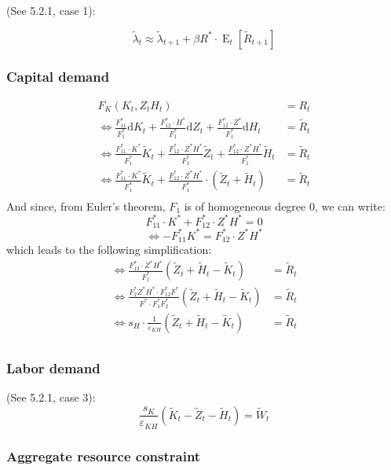\documentclass[12pt]{report}
\def\D{\mathrm{d}}
\newcommand{\Et}[1]{\operatorname{E}_t\left[#1\right]}
\def\D{\mathrm{d}}
\begin{document}
(See 5.2.1, case 1):

$$\tilde\lambda_t  \approx \tilde\lambda_{t+1} + \beta R^*\cdot\Et{\tilde R_{t+1}}$$

\subsubsection{Capital demand}

\begin{align*}
F_K(K_t, Z_tH_t) & = R_t \\
\Leftrightarrow \frac{F_{11}^*}{F_1^*}\D K_t + \frac{ F_{12}^*\cdot H^*}{F_1^*}\D Z_t + \frac{F_{12}^*\cdot Z^* }{F_1^*}\D H_t & = \tilde R_t \\
\Leftrightarrow \frac{F_{11}^*\cdot K^*}{F_1^*}\tilde K_t + \frac{ F_{12}^* \cdot Z^*H^*}{F_1^*}\tilde Z_t + \frac{ F_{12}^*\cdot Z^*H^*}{F_1^*}\tilde H_t & = \tilde R_t \\
\Leftrightarrow \frac{F_{11}^*\cdot K^*}{F_1^*}\tilde K_t + \frac{ F_{12}^* \cdot Z^*H^*}{F_1^*}\cdot (\tilde Z_t + \tilde H_t) & = \tilde R_t \\
\end{align*}
And since, from Euler's theorem, $F_1$ is of homogeneous degree 0, we can write: $$F_{11}^*\cdot K^* + F_{12}^* \cdot Z^*H^* = 0 $$ $$\Leftrightarrow - F_{11}^*K^*  =  F_{12}^* \cdot Z^*H^* $$ which leads to the following simplification:
\begin{align*}
\Leftrightarrow \frac{F_{12}^* \cdot Z^*H^*}{F_1^*}(\tilde Z_t + \tilde H_t - \tilde K_t) & = \tilde R_t \\
\Leftrightarrow \frac{F_2^*Z^*H^*\cdot F_{12}^* F^*}{F^*\cdot F_1^*F_2^*}(\tilde Z_t + \tilde H_t - \tilde K_t) & = \tilde R_t\\
\Leftrightarrow s_{H}\cdot \frac{1}{\varepsilon_{KH}}(\tilde Z_t + \tilde H_t - \tilde K_t) & = \tilde R_t \\
\end{align*}

\subsubsection{Labor demand}

(See 5.2.1, case 3):
$$ \frac{s_{K}}{\varepsilon_{KH}}(\tilde K_t - \tilde Z_t - \tilde H_t) = \tilde W_t  $$

\subsubsection{Aggregate resource constraint}
\end{document}
